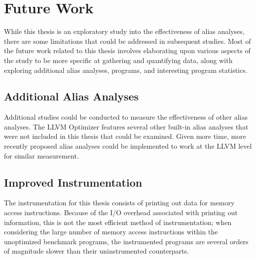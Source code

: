 \chapter{Future Work}

While this thesis is an exploratory study into the effectiveness of alias analyses, there are some limitations that could be addressed in subsequent studies. Most of the future work related to this thesis involves elaborating upon various aspects of the study to be more specific at gathering and quantifying data, along with exploring additional alias analyses, programs, and interesting program statistics.

\section{Additional Alias Analyses}
Additional studies could be conducted to measure the effectiveness of other alias analyses. The LLVM Optimizer features several other built-in alias analyses that were not included in this thesis that could be examined. Given more time, more recently proposed alias analyses could be implemented to work at the LLVM level for similar measurement.

\section{Improved Instrumentation}
The instrumentation for this thesis consists of printing out data for memory access instructions. Because of the I/O overhead associated with printing out information, this is not the most efficient method of instrumentation; when considering the large number of memory access instructions within the unoptimized benchmark programs, the instrumented programs are several orders of magnitude slower than their uninstrumented counterparts.
